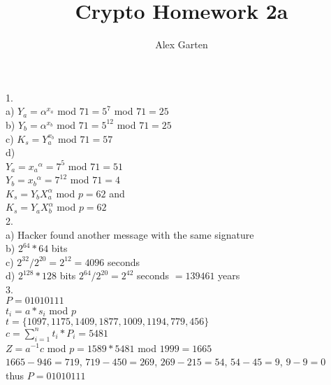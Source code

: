 \documentclass{article}
\begin{document}
\title{Crypto Homework 2a}
\author{Alex Garten}
\date{}

1.\\
a) $Y_a = \alpha^{x_a}$ mod $ 71 = 5^7 $ mod $ 71 = 25 $ \\
b) $Y_b = \alpha^{x_b}$ mod $ 71 = 5^12 $ mod $ 71 = 25 $ \\
c) $K_s = Y_a^{x_b} $ mod $ 71 = 57 $ \\
d) \\
$Y_a = {x_a}^\alpha = 7^5$ mod $ 71 = 51$ \\
$Y_b = {x_b}^\alpha = 7^12$ mod $ 71 = 4$ \\
$K_s = Y_bX_a^\alpha $ mod $ p = 62$ and \\
$K_s = Y_aX_b^\alpha $ mod $ p = 62$\\

2. \\
a) Hacker found another message with the same signature \\
b) $2^{64}*64$ bits \\
c) $2^{32}/2^{20} = 2^{12} = 4096$ seconds\\
d) $2^{128}*128$ bits $2^{64}/2^20 = 2^42$ seconds $ = 139461$ years \\

3. \\
$P = 01010111$ \\
$t_i = a*s_i$ mod $p$ \\
$t = \{1097, 1175, 1409, 1877, 1009, 1194,  779,  456\}$ \\
$c = \sum\limits_{i=1}^nt_i*P_i = 5481$ \\
$Z = a^{-1}c$ mod $p = 1589*5481$ mod $1999 = 1665$\\
$1665 - 946 = 719$, $719-450=269$, $269-215=54$, $54-45=9$, $9-9=0$\\
thus $P=01010111$
\end{document}
